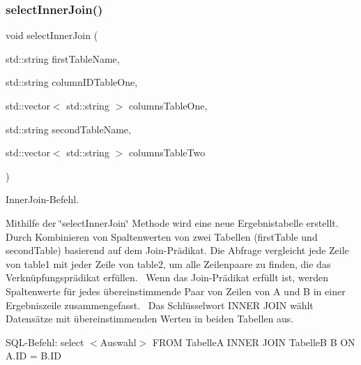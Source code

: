 \subsubsection{select\+Inner\+Join()}
{\footnotesize\ttfamily void select\+Inner\+Join (\begin{DoxyParamCaption}\item[{std\+::string}]{first\+Table\+Name,  }\item[{std\+::string}]{column\+I\+D\+Table\+One,  }\item[{std\+::vector$<$ std\+::string $>$}]{columns\+Table\+One,  }\item[{std\+::string}]{second\+Table\+Name,  }\item[{std\+::vector$<$ std\+::string $>$}]{columns\+Table\+Two }\end{DoxyParamCaption})}



Inner\+Join-\/\+Befehl. 

Mithilfe der \char`\"{}select\+Inner\+Join\char`\"{} Methode wird eine neue Ergebnistabelle erstellt.~\newline
 Durch Kombinieren von Spaltenwerten von zwei Tabellen (first\+Table und second\+Table) basierend auf dem Join-\/\+Prädikat. Die Abfrage vergleicht jede Zeile von table1 mit jeder Zeile von table2, um alle Zeilenpaare zu finden, die das Verknüpfungsprädikat erfüllen.~\newline
 Wenn das Join-\/\+Prädikat erfüllt ist, werden Spaltenwerte für jedes übereinstimmende Paar von Zeilen von A und B in einer Ergebniszeile zusammengefasst.~\newline
 Das Schlüsselwort I\+N\+N\+ER J\+O\+IN wählt Datensätze mit übereinstimmenden Werten in beiden Tabellen aus.~\newline


S\+Q\+L-\/\+Befehl\+: select $<$\+Auswahl$>$ F\+R\+OM TabelleA I\+N\+N\+ER J\+O\+IN TabelleB B ON A.\+ID = B.\+ID


